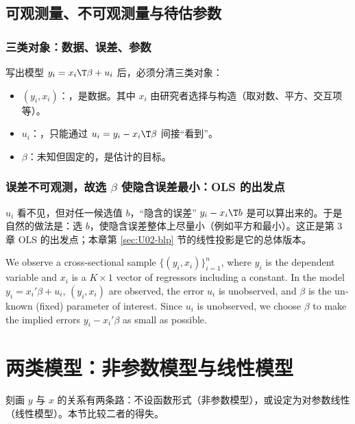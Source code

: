 \subsection{可观测量、不可观测量与待估参数}

\subsubsection{三类对象：数据、误差、参数}

写出模型 $y_i=x_i\T\beta+u_i$ 后，必须分清三类对象：
\begin{itemize}
  \item $(y_i,x_i)$：，是数据。其中 $x_i$ 由研究者选择与构造（取对数、平方、交互项等）。
  \item $u_i$：，只能通过 $u_i=y_i-x_i\T\beta$ 间接“看到”。
  \item $\beta$：未知但固定的，是估计的目标。
\end{itemize}

\subsubsection{误差不可观测，故选 \texorpdfstring{$\beta$}{beta} 使隐含误差最小：OLS 的出发点}

$u_i$ 看不见，但对任一候选值 $b$，“隐含的误差” $y_i-x_i\T b$ 是可以算出来的。于是自然的做法是：选 $b$，使隐含误差整体上尽量小（例如平方和最小）。这正是第 3 章 OLS 的出发点；本章第 \ref{sec:U02-blp} 节的线性投影是它的总体版本。

\begin{english}
We observe a cross-sectional sample $\{(y_i,x_i)\}_{i=1}^n$, where $y_i$ is the dependent variable and $x_i$ is a $K\times1$ vector of regressors including a constant. In the model $y_i=x_i'\beta+u_i$, $(y_i,x_i)$ are observed, the error $u_i$ is unobserved, and $\beta$ is the unknown (fixed) parameter of interest. Since $u_i$ is unobserved, we choose $\beta$ to make the implied errors $y_i-x_i'\beta$ as small as possible.
\end{english}

\section{两类模型：非参数模型与线性模型}\label{sec:U02-models}

刻画 $y$ 与 $x$ 的关系有两条路：不设函数形式（非参数模型），或设定为对参数线性（线性模型）。本节比较二者的得失。

